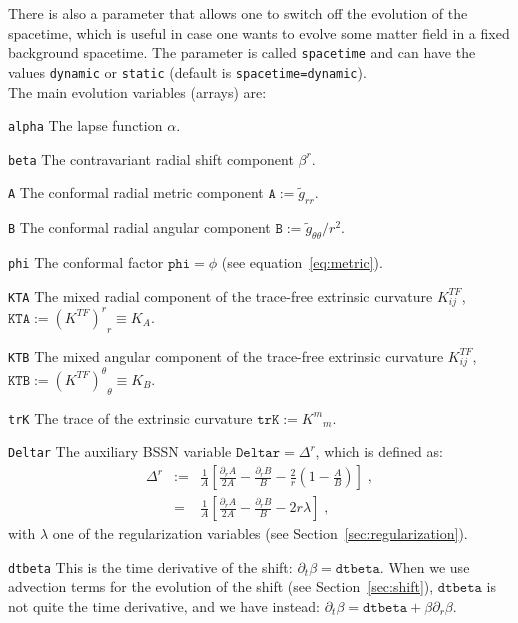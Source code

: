 \documentclass[12pt]{article}
\begin{document}
There is also a parameter that allows one to switch off the evolution
of the spacetime, which is useful in case one wants to evolve some
matter field in a fixed background spacetime. The parameter is called
\texttt{spacetime} and can have the values \texttt{dynamic} or
  \texttt{static} (default is \texttt{spacetime=dynamic}). \\

The main evolution variables (arrays) are:

\begin{list}{}{
\setlength{\leftmargin}{35mm}
\setlength{\labelsep}{10mm}
\setlength{\labelwidth}{20mm}}

\item[\texttt{alpha}] The lapse function $\alpha$.

\item[\texttt{beta}] The contravariant radial shift component $\beta^r$.

\item[\texttt{A}] The conformal radial metric component $\texttt{A}:=\tilde{g}_{rr}$.

\item[\texttt{B}] The conformal radial angular component $\texttt{B}:=\tilde{g}_{\theta \theta}/r^2$.

\item[\texttt{phi}] The conformal factor $\texttt{phi}=\phi$ (see equation~\ref{eq:metric}).

\item[\texttt{KTA}] The mixed radial component of the trace-free
  extrinsic curvature $K^{TF}_{ij}$, \mbox{$\texttt{KTA} :=
    {(K^{TF})^r}_r \equiv K_A$}.

\item[\texttt{KTB}] The mixed angular component of the trace-free
  extrinsic curvature $K^{TF}_{ij}$, \mbox{$\texttt{KTB} :=
    {(K^{TF})^\theta}_\theta \equiv K_B$}.

\item[\texttt{trK}] The trace of the extrinsic curvature \mbox{$\texttt{trK} :=
    {K^m}_m$}.

\item[\texttt{Deltar}] The auxiliary BSSN variable
  \mbox{$\texttt{Deltar} = \Delta^r$}, which is defined as:
\begin{eqnarray}
\Delta^r &:=& \frac{1}{A} \left[ \frac{\partial_r A}{2A} - \frac{\partial_r B}{B}
- \frac{2}{r} \left( 1 - \frac{A}{B} \right) \right] \; , \nonumber \\
&=& \frac{1}{A} \left[ \frac{\partial_r A}{2A} - \frac{\partial_r B}{B}
- 2 r \lambda \right] \; ,
\end{eqnarray}
with $\lambda$ one of the regularization variables (see
Section~\ref{sec:regularization}).

\item[\texttt{dtbeta}] This is the time derivative of the shift:
  $\partial_t \beta = \texttt{dtbeta}$.  When we use advection terms
  for the evolution of the shift (see Section~\ref{sec:shift}),
  $\texttt{dtbeta}$ is not quite the time derivative, and we have
  instead: \mbox{$\partial_t \beta = \texttt{dtbeta} + \beta
    \partial_r \beta$}.

\end{list}
\end{document}

